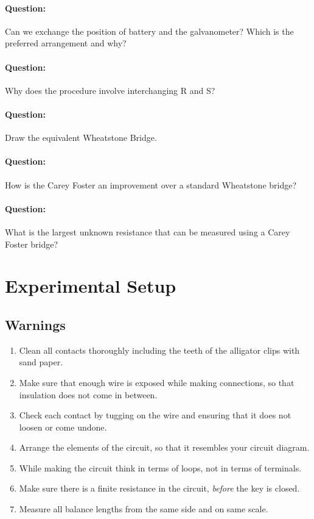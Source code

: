 \begin{question}
\paragraph{Question:} Can we exchange the position of battery and the galvanometer? Which is the preferred arrangement and why?~\\
\paragraph{Question:} Why does the procedure involve interchanging R and S?~\\
\paragraph{Question:} Draw the equivalent Wheatstone Bridge.~\\
\paragraph{Question:} How is the Carey Foster an improvement over a standard Wheatstone bridge?~\\
\paragraph{Question:} What is the largest unknown resistance that can be measured using a Carey Foster bridge?
\end{question}


\section*{Experimental Setup}

\subsection*{Warnings}
\begin{enumerate}
    \item Clean all contacts thoroughly including %
    the teeth of the alligator clips with sand paper.
    \item Make sure that enough wire is exposed while making connections, so that insulation does not come in between.
    \item Check each contact by tugging on the wire and ensuring that it does not loosen or come undone. 
    \item Arrange the elements of the circuit, so that it resembles your circuit diagram.
    \item While making the circuit think in terms of loops, not in terms of terminals. 
    \item Make sure there is a finite resistance in the circuit, \textit{before} the key is closed.
    \item Measure all balance lengths from the same side and on same scale.
\end{enumerate}


